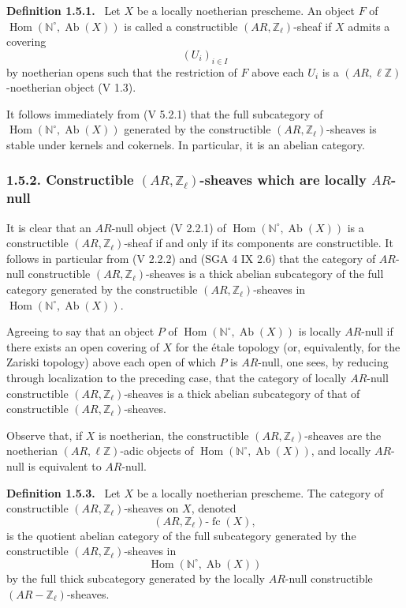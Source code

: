 \documentclass[11pt]{article}
\newenvironment{statement}[1]{\par\medskip\noindent\textbf{#1.}\ }{\par\medskip}
\DeclareMathOperator{\Hom}{Hom}
\providecommand{\Hom}{\operatorname{Hom}}
\providecommand{\Ab}{\operatorname{Ab}}
\providecommand{\fc}{\operatorname{fc}}
\begin{document}
\begin{statement}{Definition 1.5.1}
Let \(X\) be a locally noetherian prescheme. An object \(F\) of \(\Hom(\mathbb N^\circ,\Ab(X))\) is called a constructible \((AR,\mathbb Z_\ell)\)-sheaf if \(X\) admits a covering
\[
(U_i)_{i\in I}
\]
by noetherian opens such that the restriction of \(F\) above each \(U_i\) is a \((AR,\ell\mathbb Z)\)-noetherian object (V 1.3).
\end{statement}

It follows immediately from (V 5.2.1) that the full subcategory of \(\Hom(\mathbb N^\circ,\Ab(X))\) generated by the constructible \((AR,\mathbb Z_\ell)\)-sheaves is stable under kernels and cokernels. In particular, it is an abelian category.

\subsubsection*{1.5.2. Constructible \((AR,\mathbb Z_\ell)\)-sheaves which are locally \(AR\)-null}

It is clear that an \(AR\)-null object (V 2.2.1) of \(\Hom(\mathbb N^\circ,\Ab(X))\) is a constructible \((AR,\mathbb Z_\ell)\)-sheaf if and only if its components are constructible. It follows in particular from (V 2.2.2) and (SGA 4 IX 2.6) that the category of \(AR\)-null constructible \((AR,\mathbb Z_\ell)\)-sheaves is a thick abelian subcategory of the full category generated by the constructible \((AR,\mathbb Z_\ell)\)-sheaves in \(\Hom(\mathbb N^\circ,\Ab(X))\).

Agreeing to say that an object \(P\) of \(\Hom(\mathbb N^\circ,\Ab(X))\) is locally \(AR\)-null if there exists an open covering of \(X\) for the étale topology (or, equivalently, for the Zariski topology) above each open of which \(P\) is \(AR\)-null, one sees, by reducing through localization to the preceding case, that the category of locally \(AR\)-null constructible \((AR,\mathbb Z_\ell)\)-sheaves is a thick abelian subcategory of that of constructible \((AR,\mathbb Z_\ell)\)-sheaves.

Observe that, if \(X\) is noetherian, the constructible \((AR,\mathbb Z_\ell)\)-sheaves are the noetherian \((AR,\ell\mathbb Z)\)-adic objects of \(\Hom(\mathbb N^\circ,\Ab(X))\), and locally \(AR\)-null is equivalent to \(AR\)-null.

\begin{statement}{Definition 1.5.3}
Let \(X\) be a locally noetherian prescheme. The category of constructible \((AR,\mathbb Z_\ell)\)-sheaves on \(X\), denoted
\[
(AR,\mathbb Z_\ell)\text{-}\fc(X),
\]
is the quotient abelian category of the full subcategory generated by the constructible \((AR,\mathbb Z_\ell)\)-sheaves in
\[
\Hom(\mathbb N^\circ,\Ab(X))
\]
by the full thick subcategory generated by the locally \(AR\)-null constructible \((AR-\mathbb Z_\ell)\)-sheaves.
\end{statement}
\end{document}
